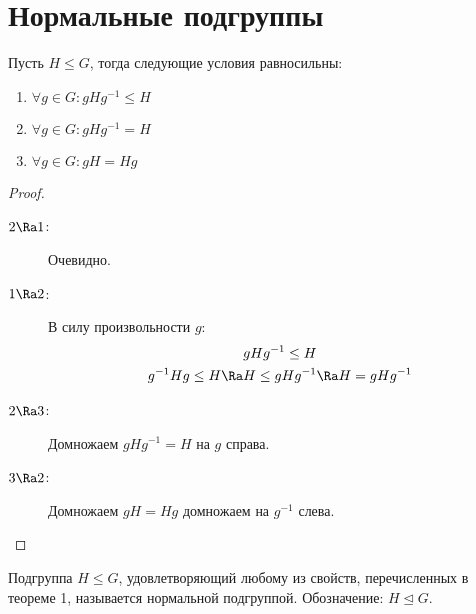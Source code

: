 \section{Нормальные подгруппы}

\begin{theorem}
	Пусть $H \le G$, тогда следующие условия равносильны:
	\begin{enumerate}
		\item $\forall g \in G \colon gHg^{-1} \le H$
		\item $\forall g \in G \colon gHg^{-1} = H$
		\item $\forall g \in G \colon gH = Hg$
	\end{enumerate}
\end{theorem}
\begin{proof}\begin{description}
\item[$2 \Ra 1$:] \hfill
	Очевидно.

\item[$1 \Ra 2$:] \hfill
	В силу произвольности $g$:
	\begin{gather*}
		gHg^{-1} \le H \\
		g^{-1}Hg \le H \Ra H \le gHg^{-1} \Ra H = gHg^{-1}
	\end{gather*}

\item[$2 \Ra 3$:] \hfill
	Домножаем $gHg^{-1} = H$ на $g$ справа.

\item[$3 \Ra 2$:] \hfill
	Домножаем $gH = Hg$ домножаем на $g^{-1}$ слева.
\end{description}\end{proof}

\begin{Def}
	Подгруппа $H \le G$, удовлетворяющий любому из свойств, перечисленных в теореме 1, называется нормальной подгруппой.
	Обозначение: $H \unlhd G$.
\end{Def}

